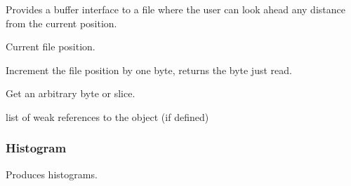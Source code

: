 \documentclass[letterpaper,10pt,english]{sphinxmanual}
\begin{document}
\begin{fulllineitems}
\label{\detokenize{ref/util/FileBuffer:TotalDepth.util.FileBuffer.FileBuffer}}
Provides a buffer interface to a file where the user can look ahead
any distance from the current position.

\begin{fulllineitems}
\label{\detokenize{ref/util/FileBuffer:TotalDepth.util.FileBuffer.FileBuffer.tell}}
Current file position.

\end{fulllineitems}


\begin{fulllineitems}
\label{\detokenize{ref/util/FileBuffer:TotalDepth.util.FileBuffer.FileBuffer.step}}
Increment the file position by one byte, returns the byte just read.

\end{fulllineitems}


\begin{fulllineitems}
\label{\detokenize{ref/util/FileBuffer:TotalDepth.util.FileBuffer.FileBuffer.__getitem__}}
Get an arbitrary byte or slice.

\end{fulllineitems}


\begin{fulllineitems}
\label{\detokenize{ref/util/FileBuffer:TotalDepth.util.FileBuffer.FileBuffer.__weakref__}}
list of weak references to the object (if defined)

\end{fulllineitems}


\end{fulllineitems}



\subsubsection{Histogram}
\label{\detokenize{ref/util/Histogram:histogram}}\label{\detokenize{ref/util/Histogram:module-TotalDepth.util.Histogram}}\label{\detokenize{ref/util/Histogram::doc}}
Produces histograms.
\end{document}
